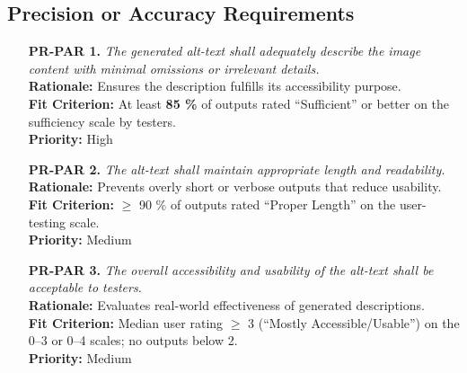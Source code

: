 \documentclass[12pt]{article}
\begin{document}
\subsection{Precision or Accuracy Requirements}
\label{sec:PrecisionAccuracy}
\begin{itemize}
  \item[\textbf{PR-PAR 1.}] \textit{The generated alt-text shall
      adequately describe the image content with minimal omissions or
    irrelevant details.}\\
    \textbf{Rationale:} Ensures the description fulfills its
    accessibility purpose.\\
    \textbf{Fit Criterion:} At least \textbf{85 \%} of outputs rated
    “Sufficient” or better on the sufficiency scale by testers.\\
    \textbf{Priority:} High

  \item[\textbf{PR-PAR 2.}] \textit{The alt-text shall maintain
    appropriate length and readability.}\\
    \textbf{Rationale:} Prevents overly short or verbose outputs that
    reduce usability.\\
    \textbf{Fit Criterion:} $\geq$ 90 \% of outputs rated “Proper
    Length” on the user-testing scale.\\
    \textbf{Priority:} Medium

  \item[\textbf{PR-PAR 3.}] \textit{The overall accessibility and
    usability of the alt-text shall be acceptable to testers.}\\
    \textbf{Rationale:} Evaluates real-world effectiveness of
    generated descriptions.\\
    \textbf{Fit Criterion:} Median user rating $\geq$ 3 (“Mostly
    Accessible/Usable”) on the 0–3 or 0–4 scales; no outputs below 2.\\
    \textbf{Priority:} Medium
\end{itemize}
\end{document}
